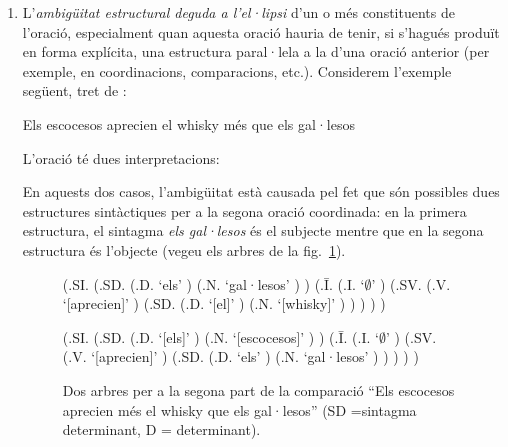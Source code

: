 \begin{enumerate}
  
\item L'\emph{ambigüitat estructural deguda a l'el·lipsi} d'un o més
  constituents de l'oració, especialment quan aquesta oració hauria de
  tenir, si s'hagués produït en forma explícita, una estructura
  paral·lela a la d'una oració anterior (per exemple, en
  coordinacions, comparacions, etc.).  Considerem l'exemple següent,
  tret de \citet{radford99b}: 
  \begin{exemple}
  \label{eq:escocesos}
  Els escocesos aprecien el
    whisky més que els gal·lesos
  \end{exemple} L'oració té dues interpretacions:
  En aquests dos casos, l'ambigüitat està causada pel fet que són
  possibles dues estructures sintàctiques per a la segona oració
  coordinada: en la primera estructura, el sintagma \emph{els
    gal·lesos} és el subjecte mentre que en la segona estructura és
  l'objecte (vegeu els arbres de la fig.~\ref{fg:whisky}).

\begin{figure}
\begin{center}
\begin{parsetree}
(.SI. (.SD. (.D. `els' ) (.N. `gal·lesos' ) ) (.{\={I}}. (.I.  `$\emptyset$' )
(.SV. (.V. `[aprecien]' ) (.SD. (.D. `[el]' ) (.N. `[whisky]' ) ) ) ) )
\end{parsetree}
\end{center}
\begin{center}
\begin{parsetree}
(.SI. (.SD. (.D. `[els]' ) (.N. `[escocesos]' ) ) (.{\={I}}. (.I. `$\emptyset$' )
(.SV. (.V. `[aprecien]' ) (.SD. (.D. `els' ) (.N. `gal·lesos' ) ) ) ) )
\end{parsetree}
\end{center}
\caption{Dos arbres per a la segona part de la comparació  ``Els
  escocesos aprecien més el whisky que els gal·lesos'' (SD =sintagma
  determinant, D = determinant).}
\label{fg:whisky}
\end{figure}


\end{enumerate}
